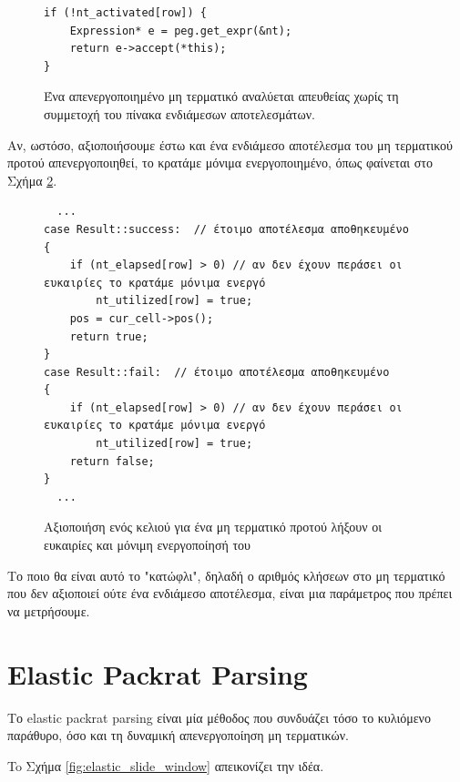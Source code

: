\begin{figure}[h]
\setlength\partopsep{-\topsep}%
\begin{verbatim}
if (!nt_activated[row]) {
    Expression* e = peg.get_expr(&nt);
    return e->accept(*this);
}
\end{verbatim}
  \caption{Ένα απενεργοποιημένο μη τερματικό αναλύεται απευθείας χωρίς τη συμμετοχή του πίνακα 
  ενδιάμεσων αποτελεσμάτων.}
\label{fig:elastic_deactivated}
\end{figure}


Αν, ωστόσο, αξιοποιήσουμε έστω και ένα ενδιάμεσο αποτέλεσμα του μη τερματικού προτού απενεργοποιηθεί, το κρατάμε μόνιμα ενεργοποιημένο, όπως φαίνεται στο Σχήμα \ref{fig:elastic_keep_active}.


\begin{figure}[h]
\setlength\partopsep{-\topsep}%
\begin{verbatim}
  ...
case Result::success:  // έτοιμο αποτέλεσμα αποθηκευμένο 
{
    if (nt_elapsed[row] > 0) // αν δεν έχουν περάσει οι ευκαιρίες το κρατάμε μόνιμα ενεργό
        nt_utilized[row] = true;
    pos = cur_cell->pos();
    return true;
}
case Result::fail:  // έτοιμο αποτέλεσμα αποθηκευμένο 
{
    if (nt_elapsed[row] > 0) // αν δεν έχουν περάσει οι ευκαιρίες το κρατάμε μόνιμα ενεργό
        nt_utilized[row] = true;
    return false;
}
  ...
\end{verbatim}
  \caption{Aξιοποιήση ενός κελιού για ένα μη τερματικό προτού λήξουν οι ευκαιρίες και μόνιμη ενεργοποίησή του}
\label{fig:elastic_keep_active}
\end{figure}

Το ποιο θα είναι αυτό το "κατώφλι", δηλαδή ο αριθμός κλήσεων στο μη τερματικό που δεν αξιοποιεί ούτε ένα ενδιάμεσο αποτέλεσμα, είναι μια παράμετρος που πρέπει να μετρήσουμε.

\section{Elastic Packrat Parsing}

Το elastic packrat parsing είναι μία μέθοδος που συνδυάζει τόσο το κυλιόμενο παράθυρο, όσο και τη δυναμική απενεργοποίηση μη τερματικών.

To Σχήμα \ref{fig:elastic_slide_window} απεικονίζει την ιδέα.

